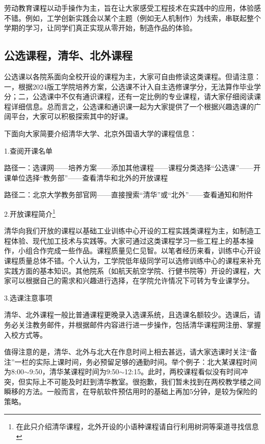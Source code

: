 \documentclass[11pt,oneside]{book}
\begin{document}
劳动教育课程以动手操作为主，旨在让大家感受工程技术在实践中的应用，体验感不错。例如，工学创新实践会以某个主题（例如无人机制作）为线索，串联起整个学期的学习，让同学们真正实现从零开始，制造作品的体验。

\subsection{公选课程，清华、北外课程}
公选课以各院系面向全校开设的课程为主，大家可自由修读这类课程。但请注意：一，根据2024版工学院培养方案，公选课不计入自主选修课学分，无法算作毕业学分；二，公选课中不仅有通识课程，还有一定比例的专业课程，请大家仔细阅读课程详细信息。总而言之，公选课和通识课一起为大家提供了一个根据兴趣选课的广阔平台，大家可以积极探索其中的好课。

\vspace{10pt}

下面向大家简要介绍清华大学、北京外国语大学的课程信息：

\vspace{10pt}

1.查阅开课名单

路径一：选课网——培养方案——添加其他课程——课程分类选择“公选课”——开课单位选择“教务部”——查看清华和北外的开放课程

路径二：北京大学教务部官网——直接搜索“清华”或“北外”——查看通知和附件

\vspace{10pt}

2.开放课程简介\footnote{在此只介绍清华课程，北外开设的小语种课程请自行利用树洞等渠道寻找信息}

清华向我们开放的课程以基础工业训练中心开设的工程实践类课程为主，如制造工程体验、现代加工技术与实践等。大家可通过这类课程学习一些工程上的基本操作，小组合作完成一些作品。课程质量见仁见智。以笔者经历来看，训练中心开设课程质量总体不错。个人认为，工学院低年级同学可以选修训练中心的课程来补充实践方面的基本知识。其他院系（如航天航空学院、行健书院等）开设的课程，大家可以根据自己的需求和兴趣进行选择，在学院允许情况下可转为专业课学分。

\vspace{10pt}

3.选课注意事项

清华、北外课程一般比普通课程更晚录入选课系统，且选课名额较少。选课后，请务必关注教务邮件，并根据邮件内容进行进一步操作，包括清华课程网注册、掌握入校方式等。

值得注意的是，清华、北外与北大在作息时间上相去甚远，请大家选课时关注“备注”一栏的实际上课时间，务必预留足够的通勤时间。举个例子：北大某课程时间为8:00$\sim$9:50，清华某课程时间为9:50$\sim$12:15。此时，两校课程看似没有时间冲突，但实际上不可能及时赶到清华教室。很抱歉，我们暂未找到在两校教学楼之间瞬移的方法。一般而言，在导航软件预估用时的基础上再加5分钟，是较为保险的策略。
\end{document}
